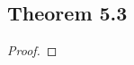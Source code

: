 \documentclass[../../main.tex]{subfiles}
\begin{document}
\subsection{Theorem 5.3}
\begin{wts}

\end{wts}
\begin{proof}

\end{proof}
\end{document}
